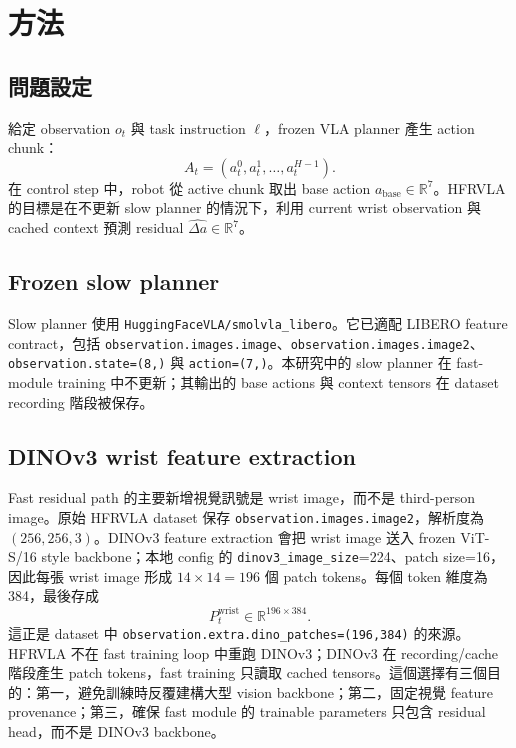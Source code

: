 \documentclass[12pt,a4paper,oneside]{report}
\newcommand{\abase}{a_{\mathrm{base}}}
\newcommand{\deltah}{\hat{\Delta a}}
\begin{document}
\chapter{方法}
\label{chap:method}

\section{問題設定}

給定 observation $o_t$ 與 task instruction $\ell$，frozen VLA planner 產生 action chunk：
\begin{equation}
  A_t = (a_t^0, a_t^1, \ldots, a_t^{H-1}).
\end{equation}
在 control step 中，robot 從 active chunk 取出 base action $\abase \in \mathbb{R}^7$。HFRVLA 的目標是在不更新 slow planner 的情況下，利用 current wrist observation 與 cached context 預測 residual $\deltah \in \mathbb{R}^7$。

\section{Frozen slow planner}

Slow planner 使用 \texttt{HuggingFaceVLA/smolvla\_libero}。它已適配 LIBERO feature contract，包括 \texttt{observation.images.image}、\texttt{observation.images.image2}、\texttt{observation.state=(8,)} 與 \texttt{action=(7,)}。本研究中的 slow planner 在 fast-module training 中不更新；其輸出的 base actions 與 context tensors 在 dataset recording 階段被保存。

\section{DINOv3 wrist feature extraction}

Fast residual path 的主要新增視覺訊號是 wrist image，而不是 third-person image。原始 HFRVLA dataset 保存 \texttt{observation.images.image2}，解析度為 $(256,256,3)$。DINOv3 feature extraction 會把 wrist image 送入 frozen ViT-S/16 style backbone；本地 config 的 \texttt{dinov3\_image\_size}=224、patch size=16，因此每張 wrist image 形成 $14\times14=196$ 個 patch tokens。每個 token 維度為 384，最後存成
\begin{equation}
  P_t^{\mathrm{wrist}}\in\mathbb{R}^{196\times384}.
\end{equation}
這正是 dataset 中 \texttt{observation.extra.dino\_patches=(196,384)} 的來源。HFRVLA 不在 fast training loop 中重跑 DINOv3；DINOv3 在 recording/cache 階段產生 patch tokens，fast training 只讀取 cached tensors。這個選擇有三個目的：第一，避免訓練時反覆建構大型 vision backbone；第二，固定視覺 feature provenance；第三，確保 fast module 的 trainable parameters 只包含 residual head，而不是 DINOv3 backbone。
\end{document}

